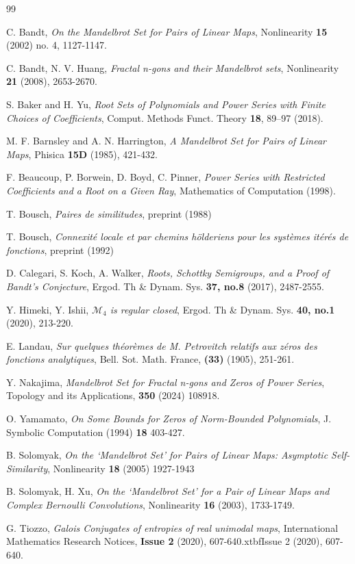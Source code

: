 \documentclass[11pt]{amsart}
\numberwithin{theorem}{section} %
\numberwithin{corollary}{section}
\numberwithin{lemma}{section}
\numberwithin{proposition}{section}
\numberwithin{definition}{section}
\begin{document}
\begin{thebibliography}{99}

\bibitem[Ba]{}  C. Bandt, \textit{On the Mandelbrot Set for Pairs of Linear Maps}, Nonlinearity \textbf{15} (2002) no. 4, 1127-1147.

\bibitem[BHu]{} C. Bandt, N. V. Huang, \textit{Fractal n-gons and their Mandelbrot sets}, Nonlinearity \textbf{21} (2008), 2653-2670.

\bibitem[BY]{} S. Baker and H. Yu, \textit{Root Sets of Polynomials and Power Series with Finite Choices of Coefficients}, Comput. Methods Funct. Theory \textbf{18}, 89–97 (2018).

\bibitem[BHa]{} M. F. Barnsley and A. N. Harrington, \textit{A Mandelbrot Set for Pairs of Linear Maps}, Phisica \textbf{15D} (1985), 421-432.

\bibitem[BBBP]{} F. Beaucoup, P. Borwein, D. Boyd, C. Pinner, \textit{Power Series with Restricted Coefficients and a Root on a Given Ray}, Mathematics of Computation (1998).

\bibitem[Bo1]{} T. Bousch, \textit{Paires de similitudes}, preprint (1988)

\bibitem[Bo2]{} T. Bousch, \textit{Connexit\'e locale et par chemins h\"olderiens pour les syst\`emes it\'er\'es de fonctions}, preprint (1992)

\bibitem[CKW]{} D. Calegari, S. Koch, A. Walker, \textit{Roots, Schottky Semigroups, and a Proof of Bandt's Conjecture}, Ergod. Th \& Dynam. Sys. \textbf{37, no.8} (2017), 2487-2555.

\bibitem[Hi]{} Y. Himeki, Y. Ishii, \textit{$\mathcal{M}_4$ is regular closed}, Ergod. Th \& Dynam. Sys. \textbf{40, no.1} (2020), 213-220.

\bibitem[La]{} E. Landau, \textit{Sur quelques th\'eor\`emes de M. Petrovitch relatifs aux z\'eros des fonctions analytiques}, Bell. Sot. Math. France, \textbf{(33)} (1905), 251-261.

\bibitem[Na]{} Y. Nakajima, \textit{Mandelbrot Set for Fractal n-gons and Zeros of Power Series}, Topology and its Applications, \textbf{350} (2024) 108918.

\bibitem[OY]{} O. Yamamato, \textit{On Some Bounds for Zeros of Norm-Bounded Polynomials}, J. Symbolic Computation (1994) \textbf{18} 403-427.

\bibitem[So]{} B. Solomyak, \textit{On the `Mandelbrot Set' for Pairs of Linear Maps: Asymptotic Self-Similarity}, Nonlinearity \textbf{18} (2005) 1927-1943

\bibitem[SX]{} B. Solomyak, H. Xu, \textit{On the `Mandelbrot Set' for a Pair of Linear Maps and Complex Bernoulli Convolutions}, Nonlinearity \textbf{16} (2003), 1733-1749.

\bibitem[Ti]{} G. Tiozzo, \textit{Galois Conjugates of entropies of real unimodal maps}, International Mathematics Research Notices, \textbf{Issue 2} (2020), 607-640.xtbf{Issue 2} (2020), 607-640.


\end{thebibliography}
\end{document}
